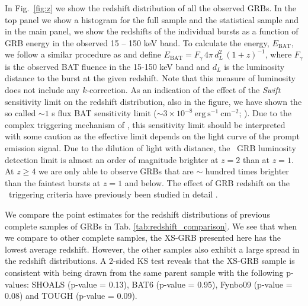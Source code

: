 \documentclass{aa}    %
\begin{document}
In Fig.~\ref{fig:z} we show the redshift distribution of all  the observed GRBs.
In the top panel we show a histogram for the full sample and the statistical
sample and in the main panel, we show the redshifts of the individual bursts as
a function of GRB energy in the observed 15 -- 150 keV band. To calculate the
energy, $E_{\mathrm{BAT}}$, we follow a similar procedure as \citet{Lien2016}
and define $E_{\mathrm{BAT}} = F_{\gamma}\,4 \pi\,d_L^2\,(1+z)^{-1}$, where
$F_{\gamma}$ is the observed BAT fluence in the 15-150 keV band and $d_L$ is the
luminosity distance to the burst at the given redshift. Note that this measure
of luminosity does not include any $k$-correction. As an indication of the
effect of the \textit{Swift} sensitivity limit on the redshift distribution,
also in the figure, we have shown the so called $\sim 1$ s flux BAT sensitivity
limit ($\sim 3 \times 10^{-8}~\mathrm{erg}~\mathrm{s}^{-1}~\mathrm{cm}^{-2}$;
\citealt{Baumgartner2013, Lien2016}). Due to the complex triggering mechanism of
\swift, this sensitivity limit should be interpreted with some caution as the
effective limit depends on the light curve of the prompt emission signal. Due to
the dilution of light with distance, the \swift~GRB luminosity detection limit
is almost an order of magnitude brighter at $z=2$ than at $z=1$. At $z\geq4$ we
are only able to observe GRBs that are $\sim$ hundred times brighter than the
faintest bursts at $z=1$ and below. The effect of GRB redshift on the
\swift~triggering criteria have previously been studied in detail
\citep{Littlejohns2013a}.

We compare the point estimates for the redshift distributions of previous
complete samples of GRBs in Tab. \ref{tab:redshift_comparison}. We see that when
we compare to other complete samples, the XS-GRB presented here has the lowest
average redshift. However, the other samples also exhibit a large spread in the
redshift distributions. A 2-sided KS test reveals that the XS-GRB sample is
consistent with being drawn from the same parent sample with the following
p-values: SHOALS (p-value = 0.13), BAT6 (p-value = 0.95), Fynbo09 (p-value =
0.08) and TOUGH (p-value = 0.09).
\end{document}
